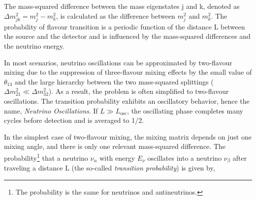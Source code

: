 The mass-squared difference between the mass eigenstates j and k, denoted as $\Delta m_{jk}^2 = m_j^2 - m_k^2$, is calculated as the difference between $m_j^2$ and $m_k^2$. The probability of flavour transition is a periodic function of the distance L between the source and the detector and is influenced by the mass-squared differences and the neutrino energy. 


In most scenarios, neutrino oscillations can be approximated by two-flavour mixing due to the suppression of three-flavour mixing effects by the small value of $\theta_{13}$ and the large hierarchy between the two mass-squared splittings ($\Delta m_{21}^2 \ll \Delta m_{32}^2$). As a result, the problem is often simplified to two-flavour oscillations. The transition probability exhibits an oscillatory behavior, hence the name, \emph{Neutrino Oscillations}. If $L \gg L_{\mathrm{osc}}$, the oscillating phase completes many cycles before detection and is averaged to 1/2.

In the simplest case of two-flavour mixing, the mixing matrix depends on just one mixing angle, and there is only one relevant mass-squared difference. The probability\footnote{The probability is the same for neutrinos and antineutrinos.} that a neutrino $\nu_{\alpha}$ with energy $E_{\nu}$ oscillates into a neutrino $\nu_{\beta}$ after traveling a distance L (the so-called \emph{transition probability}) is given by,


